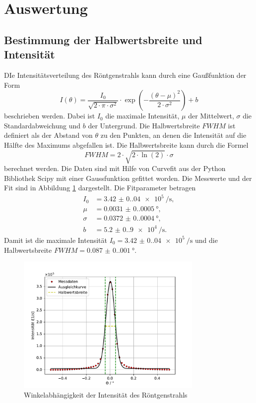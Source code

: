 \section{Auswertung}
\label{sec:Auswertung}
\subsection{Bestimmung der Halbwertsbreite und Intensität}
DIe Intensitätsverteilung des Röntgenstrahls kann durch eine Gaußfunktion der Form
\begin{equation}
    I(\theta)=\frac{I_0}{\sqrt{2\cdot \pi \cdot \sigma^2}} \cdot \exp\left(-\frac{(\theta-\mu)^2}{2\cdot \sigma^2}\right)+b
\end{equation}
beschrieben werden. Dabei ist $I_0$ die maximale Intensität, $\mu$ der Mittelwert, $\sigma$ die Standardabweichung und $b$ der Untergrund. Die Halbwertsbreite $FWHM$ ist definiert als der Abstand von $\theta$ zu den Punkten, an denen die Intensität auf die Hälfte des Maximums abgefallen ist. Die Halbwertsbreite kann durch die Formel
\begin{equation}
    FWHM = 2\cdot \sqrt{2\cdot \ln(2)}\cdot \sigma
\end{equation}
berechnet werden. Die Daten sind mit Hilfe von Curvefit aus der Python Bibliothek Scipy \cite{scipy} mit einer Gaussfunktion gefittet worden.
Die Messwerte und der Fit sind in Abbildung \ref{fig:Detectorscan} dargestellt. Die Fitparameter betragen
\begin{align*}
    I_0 &= \SI{3.42(0.04)e5}{\per\second}, \\
    \mu &= \SI{0.0031(0.0005)}{\degree}, \\
    \sigma &= \SI{0.0372(0.0004)}{\degree}, \\
    b &= \SI{5.2(0.9)e4}{\per\second}.
\end{align*}
Damit ist die maximale Intensität $I_0=\SI{3.42(0.04)e5}{\per\second}$ und die Halbwertsbreite $FWHM = \SI{0.087(0.001)}{\degree}$.
\begin{figure}[H]
    \centering
    \includegraphics[width=0.8\textwidth]{plots/Detectorscan.pdf}
    \caption{Winkelabhängigkeit der Intensität des Röntgenstrahls}
    \label{fig:Detectorscan}
\end{figure}
